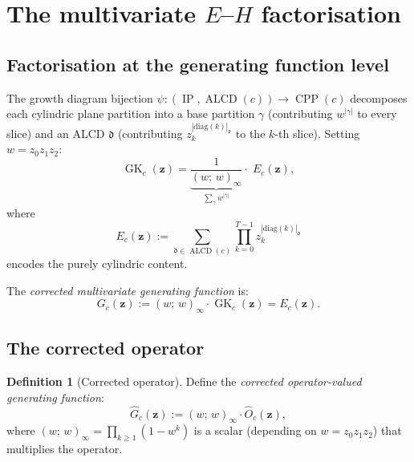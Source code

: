 \documentclass[11pt]{article}
\newcommand{\GK}{\operatorname{GK}}
\newcommand{\CPP}{\operatorname{CPP}}
\newcommand{\ALCD}{\operatorname{ALCD}}
\newcommand{\IP}{\operatorname{IP}}
\theoremstyle{plain}
\theoremstyle{definition}
\newtheorem{definition}[theorem]{Definition}
\begin{document}
\section{The multivariate $E$--$H$ factorisation}
\label{sec:EH}

\subsection{Factorisation at the generating function level}

The growth diagram bijection
$\psi\colon (\IP, \ALCD(c)) \to \CPP(c)$ decomposes each cylindric
plane partition into a base partition $\gamma$ (contributing
$w^{|\gamma|}$ to every slice) and an ALCD $\mathfrak{d}$
(contributing $z_k^{|\mathrm{diag}(k)|_\mathfrak{d}}$ to the
$k$-th slice).  Setting $w = z_0 z_1 z_2$:
\begin{equation}\label{eq:EH-multi}
  \GK_c(\mathbf{z})
  = \underbrace{\frac{1}{(w;\,w)_\infty}}_{\displaystyle\sum_\gamma
    w^{|\gamma|}}
  \cdot\; E_c(\mathbf{z}),
\end{equation}
where
\begin{equation}\label{eq:Ec}
  E_c(\mathbf{z})
  := \sum_{\mathfrak{d} \in \ALCD(c)}
     \prod_{k=0}^{T-1} z_k^{|\mathrm{diag}(k)|_\mathfrak{d}}
\end{equation}
encodes the purely cylindric content.

The \emph{corrected multivariate generating function} is:
\begin{equation}\label{eq:Gc-multi}
  G_c(\mathbf{z})
  := (w;\,w)_\infty \cdot \GK_c(\mathbf{z})
  = E_c(\mathbf{z}).
\end{equation}

\subsection{The corrected operator}

\begin{definition}[Corrected operator]
\label{def:G-hat}
Define the \emph{corrected operator-valued generating function}:
\begin{equation}\label{eq:G-hat}
  \hat{G}_c(\mathbf{z})
  := (w;\,w)_\infty \cdot \hat{O}_c(\mathbf{z}),
\end{equation}
where $(w;\,w)_\infty = \prod_{k \geq 1}(1 - w^k)$ is a scalar
(depending on $w = z_0 z_1 z_2$) that multiplies the operator.
\end{definition}
\end{document}
